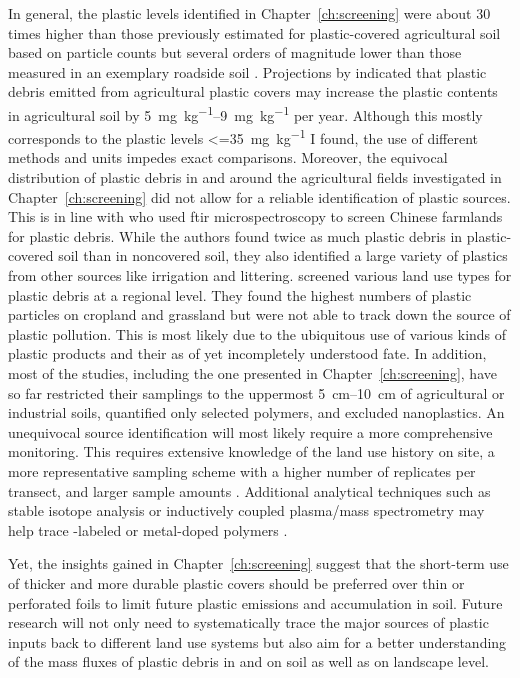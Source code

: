 In general, the plastic levels identified in Chapter~\ref{ch:screening} were about \num{30} times higher than those previously estimated for plastic-covered agricultural soil based on particle counts \citep{BuksGlobal2020} but several orders of magnitude lower than those measured in an exemplary roadside soil \citep{DierkesQuantification2019}. Projections by \citet{BrandesIdentifying2021} indicated that plastic debris emitted from agricultural plastic covers may increase the plastic contents in agricultural soil by \SIrange{5}{9}{\milli\gram\per\kilo\gram} per year.
Although this mostly corresponds to the plastic levels \SI{<=35}{\milli\gram\per\kilo\gram} I found, the use of different methods and units impedes exact comparisons. Moreover, the equivocal distribution of plastic debris in and around the agricultural fields investigated in Chapter~\ref{ch:screening} did not allow for a reliable identification of plastic sources. This is in line with \citet{ZhouMicroplastics2020} who used \ac{ftir} microspectroscopy to screen Chinese farmlands for plastic debris. While the authors found twice as much plastic debris in plastic-covered soil than in noncovered soil, they also identified a large variety of plastics from other sources like irrigation and littering.
 screened various land use types for plastic debris at a regional level. They found the highest numbers of plastic particles on cropland and grassland but were not able to track down the source of plastic pollution.
This is most likely due to the ubiquitous use of various kinds of plastic products and their as of yet incompletely understood fate. In addition, most of the studies, including the one presented in Chapter~\ref{ch:screening}, have so far restricted their samplings to the uppermost \SIrange{5}{10}{\centi\meter} of agricultural or industrial soils, quantified only selected polymers, and excluded nanoplastics. An unequivocal source identification will most likely require a more comprehensive monitoring. This requires extensive knowledge of the land use history on site, a more representative sampling scheme with a higher number of replicates per transect, and larger sample amounts \citep[Section~\ref{sec:general-discussion:analytics};][]{YuHow2021}. Additional analytical techniques such as stable isotope analysis or inductively coupled plasma\slash mass spectrometry may help trace -labeled or metal-doped polymers \citep{MitranoSynthesis2019}.

Yet, the insights gained in Chapter~\ref{ch:screening} suggest that the short-term use of thicker and more durable plastic covers should be preferred over thin or perforated foils to limit future plastic emissions and accumulation in soil. Future research will not only need to systematically trace the major sources of plastic inputs back to different land use systems but also aim for a better understanding of the mass fluxes of plastic debris in and on soil as well as on landscape level.

